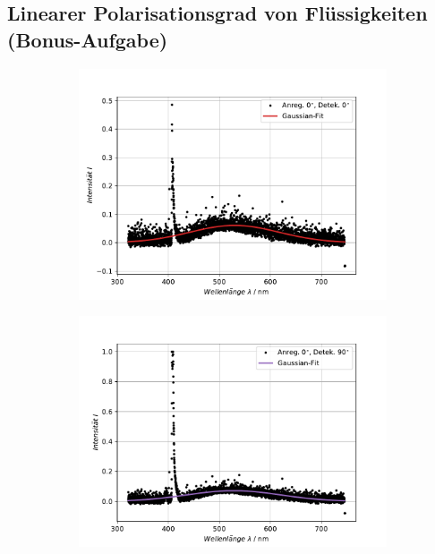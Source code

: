 \subsection{Linearer Polarisationsgrad von Flüssigkeiten (Bonus-Aufgabe)}

\begin{figure}[hbtp]
\centering
\caption{Die PL-Spektren der Messungen von der Wein-Probe f\"{u} verschiedene Polarisationspfade.}
	\begin{subfigure}[t]{0.45\textwidth}
	\includegraphics[width=\textwidth]{Plots/aufgabe3_P1.pdf}
	\end{subfigure}
	\begin{subfigure}[t]{0.45\textwidth}
	\includegraphics[width=\textwidth]{Plots/aufgabe3_P2.pdf}

\end{subfigure}
\end{figure}
